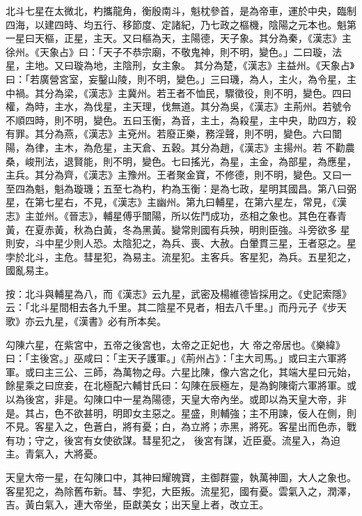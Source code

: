 \begin{pinyinscope}
 北斗七星在太微北，杓攜龍角，衡殷南斗，魁枕參首，是為帝車，運於中央，臨制四海，以建四時、均五行、移節度、定諸紀，乃七政之樞機，陰陽之元本也。魁第一星曰天樞，正星，主天。又曰樞為天，主陽德，天子象。其分為秦，《漢志》主徐州。《天象占》曰：「天子不恭宗廟，不敬鬼神，則不明，變色。」二曰璇，法星，主地。又曰璇為地，主陰刑，女主象。
 其分為楚，《漢志》主益州。《天象占》曰：「若廣營宮室，妄鑿山陵，則不明，變色。」三曰璣，為人，主火，為令星，主中禍。其分為梁，《漢志》主冀州。若王者不恤民，驟徵役，則不明，變色。四曰權，為時，主水，為伐星，主天理，伐無道。其分為吳，《漢志》主荊州。若號令不順四時，則不明，變色。五曰玉衡，為音，主土，為殺星，主中央，助四方，殺有罪。其分為燕，《漢志》主兗州。若廢正樂，務淫聲，則不明，變色。六曰闓陽，為律，主木，為危星，主天倉、五穀。其分為趙，《漢志》主揚州。若
 不勸農桑，峻刑法，退賢能，則不明，變色。七曰搖光，為星，主金，為部星，為應星，主兵。其分為齊，《漢志》主豫州。王者聚金寶，不修德，則不明，變色。又曰一至四為魁，魁為璇璣；五至七為杓，杓為玉衡：是為七政，星明其國昌。第八曰弼星，在第七星右，不見，《漢志》主幽州。第九曰輔星，在第六星左，常見，《漢志》主並州。《晉志》，輔星傅乎闓陽，所以佐鬥成功，丞相之象也。其色在春青黃，在夏赤黃，秋為白黃，冬為黑黃。變常則國有兵殃，明則臣強。斗旁欲多
 星則安，斗中星少則人恐。太陰犯之，為兵、喪、大赦。白暈貫三星，王者惡之。星孛於北斗，主危。彗星犯，為易主。流星犯。主客兵。客星犯，為兵。五星犯之，國亂易主。



 按：北斗與輔星為八，而《漢志》云九星，武密及楊維德皆採用之。《史記索隱》云：「北斗星間相去各九千里。其二陰星不見者，相去八千里。」而丹元子《步天歌》亦云九星，《漢書》必有所本矣。



 勾陳六星，在紫宮中，五帝之後宮也，太帝之正妃也，大
 帝之帝居也。《樂緯》曰：「主後宮。」巫咸曰：「主天子護軍。」《荊州占》：「主大司馬。」或曰主六軍將軍。或曰主三公、三師，為萬物之母。六星比陳，像六宮之化，其端大星曰元始，餘星乘之曰庶妾，在北極配六輔甘氏曰：勾陳在辰極左，是為鉤陳衛六軍將軍。或以為後宮，非是。勾陳口中一星為陽德，天皇大帝內坐。或即以為天皇大帝，非是。其占，色不欲甚明，明即女主惡之。星盛，則輔強；主不用諫，佞人在側，則不見。客星入之，色蒼白，將有憂；白，為立將；赤黑，將死。客星出而色赤，戰有功；守之，後宮有女使欲謀。彗星犯之，
 後宮有謀，近臣憂。流星入，為迫主。青氣入，大將憂。



 天皇大帝一星，在勾陳口中，其神曰耀魄寶，主御群靈，執萬神圖，大人之象也。客星犯之，為除舊布新。彗、孛犯，大臣叛。流星犯，國有憂。雲氣入之，潤澤，吉。黃白氣入，連大帝坐，臣獻美女；出天皇上者，改立王。




\end{pinyinscope}
